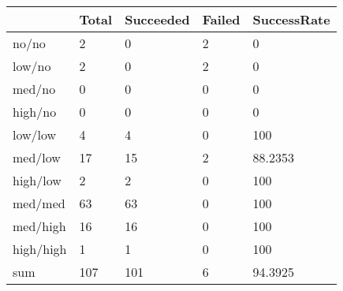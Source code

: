 \begin{tabular}{lllll}
& Total & Succeeded & Failed & SuccessRate \\ 
\hline 
no/no & 2 & 0 & 2 & 0 \\ 
low/no & 2 & 0 & 2 & 0 \\ 
med/no & 0 & 0 & 0 & 0 \\ 
high/no & 0 & 0 & 0 & 0 \\ 
low/low & 4 & 4 & 0 & 100 \\ 
med/low & 17 & 15 & 2 & 88.2353 \\ 
high/low & 2 & 2 & 0 & 100 \\ 
med/med & 63 & 63 & 0 & 100 \\ 
med/high & 16 & 16 & 0 & 100 \\ 
high/high & 1 & 1 & 0 & 100 \\ 
sum & 107 & 101 & 6 & 94.3925 \\ 
\hline 
\end{tabular}